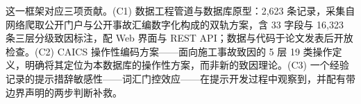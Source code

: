 \documentclass[11pt]{article}
\begin{document}
{\cjkfont 这\allowbreak 一\allowbreak 框\allowbreak 架\allowbreak 对\allowbreak 应\allowbreak 三\allowbreak 项\allowbreak 贡\allowbreak 献\allowbreak 。}(C1) {\cjkfont 数\allowbreak 据\allowbreak 工\allowbreak 程\allowbreak 管\allowbreak 道\allowbreak 与\allowbreak 数\allowbreak 据\allowbreak 库\allowbreak 原\allowbreak 型\allowbreak ：}2,623 {\cjkfont 条\allowbreak 记\allowbreak 录\allowbreak ，\allowbreak 采\allowbreak 集\allowbreak 自\allowbreak 网\allowbreak 络\allowbreak 爬\allowbreak 取\allowbreak 公\allowbreak 开\allowbreak 门\allowbreak 户\allowbreak 与\allowbreak 公\allowbreak 开\allowbreak 事\allowbreak 故\allowbreak 汇\allowbreak 编\allowbreak 数\allowbreak 字\allowbreak 化\allowbreak 构\allowbreak 成\allowbreak 的\allowbreak 双\allowbreak 轨\allowbreak 方\allowbreak 案\allowbreak ，\allowbreak 含} 33 {\cjkfont 字\allowbreak 段\allowbreak 与} 16,323 {\cjkfont 条\allowbreak 三\allowbreak 层\allowbreak 分\allowbreak 级\allowbreak 致\allowbreak 因\allowbreak 标\allowbreak 注\allowbreak ，\allowbreak 配} Web {\cjkfont 界\allowbreak 面\allowbreak 与} REST API{\cjkfont ；\allowbreak 数\allowbreak 据\allowbreak 与\allowbreak 代\allowbreak 码\allowbreak 于\allowbreak 论\allowbreak 文\allowbreak 发\allowbreak 表\allowbreak 后\allowbreak 开\allowbreak 放\allowbreak 检\allowbreak 查\allowbreak 。}(C2) CAICS {\cjkfont 操\allowbreak 作\allowbreak 性\allowbreak 编\allowbreak 码\allowbreak 方\allowbreak 案}------{\cjkfont 面\allowbreak 向\allowbreak 施\allowbreak 工\allowbreak 事\allowbreak 故\allowbreak 致\allowbreak 因\allowbreak 的} 5 {\cjkfont 层} 19 {\cjkfont 类\allowbreak 操\allowbreak 作\allowbreak 定\allowbreak 义\allowbreak ，\allowbreak 明\allowbreak 确\allowbreak 将\allowbreak 其\allowbreak 定\allowbreak 位\allowbreak 为\allowbreak 本\allowbreak 数\allowbreak 据\allowbreak 库\allowbreak 的\allowbreak 操\allowbreak 作\allowbreak 性\allowbreak 方\allowbreak 案\allowbreak ，\allowbreak 而\allowbreak 非\allowbreak 新\allowbreak 的\allowbreak 致\allowbreak 因\allowbreak 理\allowbreak 论\allowbreak 。}(C3) {\cjkfont 一\allowbreak 个\allowbreak 经\allowbreak 验\allowbreak 记\allowbreak 录\allowbreak 的\allowbreak 提\allowbreak 示\allowbreak 措\allowbreak 辞\allowbreak 敏\allowbreak 感\allowbreak 性}------{\cjkfont 词\allowbreak 汇\allowbreak 门\allowbreak 控\allowbreak 效\allowbreak 应}------{\cjkfont 在\allowbreak 提\allowbreak 示\allowbreak 开\allowbreak 发\allowbreak 过\allowbreak 程\allowbreak 中\allowbreak 观\allowbreak 察\allowbreak 到\allowbreak ，\allowbreak 并\allowbreak 配\allowbreak 有\allowbreak 带\allowbreak 边\allowbreak 界\allowbreak 声\allowbreak 明\allowbreak 的\allowbreak 两\allowbreak 步\allowbreak 判\allowbreak 断\allowbreak 补\allowbreak 救\allowbreak 。}
\end{document}
